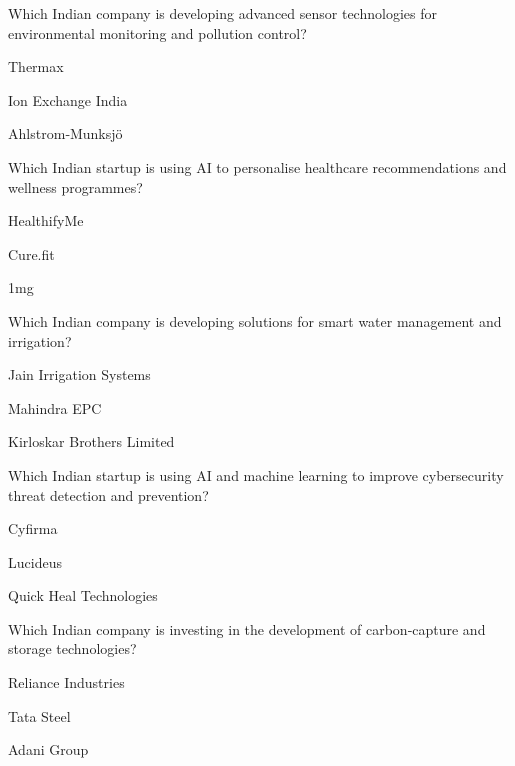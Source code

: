 \begin{enhancedmcq}{Which Indian company is developing advanced sensor technologies for environmental monitoring and pollution control?}
\item Thermax
\item Ion Exchange India
\item Ahlstrom‑Munksjö

\end{enhancedmcq}
\begin{enhancedmcq}{Which Indian startup is using AI to personalise healthcare recommendations and wellness programmes?}
\item HealthifyMe
\item Cure.fit
\item 1mg

\end{enhancedmcq}
\begin{enhancedmcq}{Which Indian company is developing solutions for smart water management and irrigation?}
\item Jain Irrigation Systems
\item Mahindra EPC
\item Kirloskar Brothers Limited

\end{enhancedmcq}
\begin{enhancedmcq}{Which Indian startup is using AI and machine learning to improve cybersecurity threat detection and prevention?}
\item Cyfirma
\item Lucideus
\item Quick Heal Technologies

\end{enhancedmcq}
\begin{enhancedmcq}{Which Indian company is investing in the development of carbon‑capture and storage technologies?}
\item Reliance Industries
\item Tata Steel
\item Adani Group
\end{enhancedmcq}